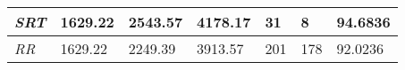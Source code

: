 \documentclass{article}
\begin{document}
\begin{table}[h!]
\begin{tabular}{|l|l|l|l|l|l|l|}
  \textit{SRT}       & 1629.22                                                                          & 2543.57                                                                     & 4178.17                                                                            & 31                                                                                    & 8                                                                                   & 94.6836                                                                    \\ \hline
  \textit{RR}        & 1629.22                                                                          & 2249.39                                                                     & 3913.57                                                                            & 201                                                                                   & 178                                                                                 & 92.0236                                                                    \\ \hline
  \end{tabular}
\end{table}
\end{document}
